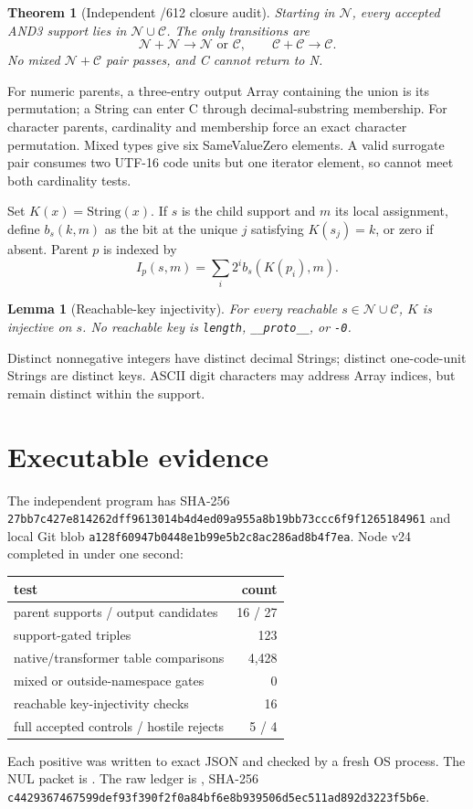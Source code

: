 \documentclass[11pt]{article}
\newtheorem{theorem}{Theorem}
\newtheorem{lemma}{Lemma}
\begin{document}
\begin{theorem}[Independent /612 closure audit]
Starting in $\mathcal N$, every accepted AND3 support lies in
$\mathcal N\cup\mathcal C$.  The only transitions are
\[
\mathcal N+\mathcal N\to\mathcal N\text{ or }\mathcal C,\qquad
\mathcal C+\mathcal C\to\mathcal C.
\]
No mixed $\mathcal N+\mathcal C$ pair passes, and C cannot return to N.
\end{theorem}
For numeric parents, a three-entry output Array containing the union is its
permutation; a String can enter C through decimal-substring membership.
For character parents, cardinality and membership force an exact character
permutation.  Mixed types give six SameValueZero elements.  A valid surrogate
pair consumes two UTF-16 code units but one iterator element, so cannot meet
both cardinality tests.

Set $K(x)=\mathrm{String}(x)$.  If $s$ is the child support and $m$ its local
assignment, define $b_s(k,m)$ as the bit at the unique $j$ satisfying
$K(s_j)=k$, or zero if absent.  Parent $p$ is indexed by
\[
I_p(s,m)=\sum_i2^i b_s(K(p_i),m).
\]
\begin{lemma}[Reachable-key injectivity]
For every reachable $s\in\mathcal N\cup\mathcal C$, $K$ is injective on
$s$.  No reachable key is \texttt{length}, \texttt{\_\_proto\_\_}, or
\texttt{-0}.
\end{lemma}
Distinct nonnegative integers have distinct decimal Strings; distinct
one-code-unit Strings are distinct keys.  ASCII digit characters may address
Array indices, but remain distinct within the support.

\section*{Executable evidence}
The independent program
has SHA-256
\texttt{27bb7c427e814262dff9613014b4d4ed09a955a8b19bb73ccc6f9f1265184961}
and local Git blob
\texttt{a128f60947b0448e1b99e5b2c8ac286ad8b4f7ea}.  Node v24 completed in
under one second:
\begin{center}
\begin{tabular}{lr}\toprule
test & count\\\midrule
parent supports / output candidates & 16 / 27\\
support-gated triples & 123\\
native/transformer table comparisons & 4,428\\
mixed or outside-namespace gates & 0\\
reachable key-injectivity checks & 16\\
full accepted controls / hostile rejects & 5 / 4\\
\bottomrule\end{tabular}
\end{center}
Each positive was written to exact JSON and checked by a fresh OS process.
The NUL packet is
.
The raw ledger is
,
SHA-256
\texttt{c4429367467599def93f390f2f0a84bf6e8b939506d5ec511ad892d3223f5b6e}.
\end{document}

